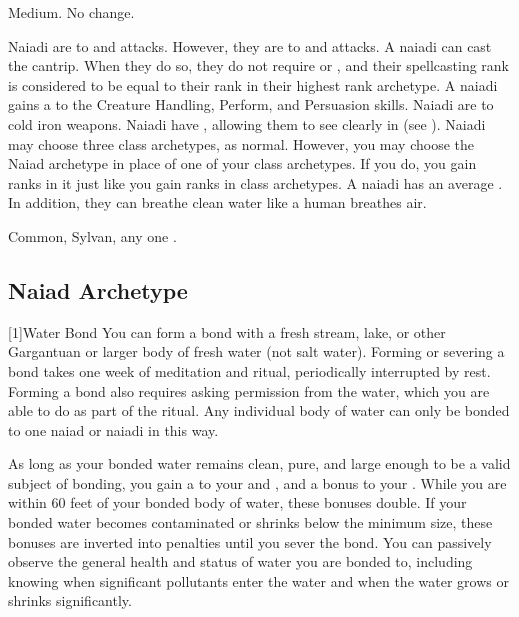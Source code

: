   Medium.
   No change.
  \begin{itemize}
     Naiadi are \impervious to \atFire and \atWater attacks.
      However, they are \vulnerable to \atCold and \atElectricity attacks.
     A naiadi can cast the  cantrip.
      When they do so, they do not require  or , and their spellcasting rank is considered to be equal to their rank in their highest rank archetype.
     A naiadi gains a   to the Creature Handling, Perform, and Persuasion skills.
     Naiadi are \vulnerable to cold iron weapons.
     Naiadi have , allowing them to see clearly in  (see ).
     Naiadi may choose three class archetypes, as normal.
      However, you may choose the Naiad archetype in place of one of your class archetypes.
      If you do, you gain ranks in it just like you gain ranks in class archetypes.
     A naiadi has an average .
      In addition, they can breathe clean water like a human breathes air.
  \end{itemize}
   Common, Sylvan, any one .

  \subsection{Naiad Archetype}

    [1]{Water Bond} You can form a bond with a fresh stream, lake, or other Gargantuan or larger body of fresh water (not salt water).
      Forming or severing a bond takes one week of meditation and ritual, periodically interrupted by rest.
      Forming a bond also requires asking permission from the water, which you are able to do as part of the ritual.
      Any individual body of water can only be bonded to one naiad or naiadi in this way.

      As long as your bonded water remains clean, pure, and large enough to be a valid subject of bonding, you gain a   to your  and , and a  bonus to your .
      While you are within 60 feet of your bonded body of water, these bonuses double.
      If your bonded water becomes contaminated or shrinks below the minimum size, these bonuses are inverted into penalties until you sever the bond.
      You can passively observe the general health and status of water you are bonded to, including knowing when significant pollutants enter the water and when the water grows or shrinks significantly.

